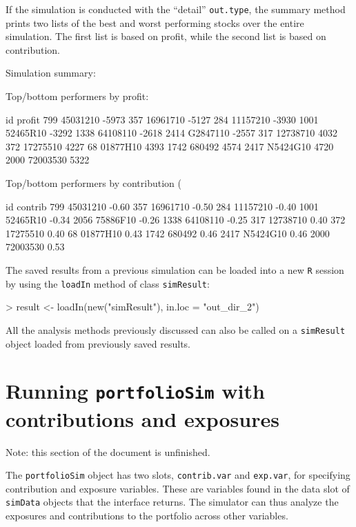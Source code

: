 \documentclass{article}
\begin{document}
If the simulation is conducted with the ``detail'' \texttt{out.type},
the summary method prints two lists of the best and worst performing
stocks over the entire simulation.  The first list is based on profit,
while the second list is based on contribution.


\begin{Schunk}
\begin{Soutput}
Simulation summary:

Top/bottom performers by profit:

           id profit
799  45031210  -5973
357  16961710  -5127
284  11157210  -3930
1001 52465R10  -3292
1338 64108110  -2618
2414 G2847110  -2557
317  12738710   4032
372  17275510   4227
68   01877H10   4393
1742   680492   4574
2417 N5424G10   4720
2000 72003530   5322

Top/bottom performers by contribution (%):

           id contrib
799  45031210   -0.60
357  16961710   -0.50
284  11157210   -0.40
1001 52465R10   -0.34
2056 75886F10   -0.26
1338 64108110   -0.25
317  12738710    0.40
372  17275510    0.40
68   01877H10    0.43
1742   680492    0.46
2417 N5424G10    0.46
2000 72003530    0.53
\end{Soutput}
\end{Schunk}

The saved results from a previous simulation can be loaded into a new
\texttt{R} session by using the \texttt{loadIn} method of class
\texttt{simResult}:

\begin{Schunk}
\begin{Sinput}
> result <- loadIn(new("simResult"), in.loc = "out_dir_2")
\end{Sinput}
\end{Schunk}

All the analysis methods previously discussed can also be called on a
\texttt{simResult} object loaded from previously saved results.


\section{Running \texttt{portfolioSim} with contributions and exposures}

Note: this section of the document is unfinished.

The \texttt{portfolioSim} object has two slots, \texttt{contrib.var}
and \texttt{exp.var}, for specifying contribution and exposure
variables.  These are variables found in the data slot of
\texttt{simData} objects that the interface returns.  The simulator
can thus analyze the exposures and contributions to the portfolio
across other variables.
\end{document}
